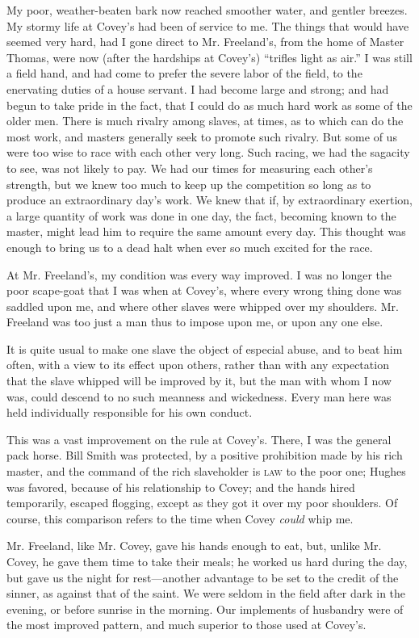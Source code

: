 My poor, weather-beaten bark now reached smoother water, and gentler
breezes. My stormy life at Covey's had been of service to me. The things
that would have seemed very hard, had I gone direct to Mr. Freeland's,
from the home of Master Thomas, were now (after the hardships at
Covey's) ``trifles light as air.'' I was still a field hand, and had
come to prefer the severe labor of the field, to the enervating duties
of a house servant. I had become large and strong; and had begun to take
pride in the fact, that I could do as much hard work as some of the
older men. There is much rivalry among slaves, at times, as to which can
do the most work, and masters generally seek to promote such rivalry.
But some of us were too wise to race with each other very long. Such
racing, we had the sagacity to see, was not likely to pay. We had our
times for measuring {}each other's strength, but we knew too much to
keep up the competition so long as to produce an extraordinary day's
work. We knew that if, by extraordinary exertion, a large quantity of
work was done in one day, the fact, becoming known to the master, might
lead him to require the same amount every day. This thought was enough
to bring us to a dead halt when ever so much excited for the race.

At Mr. Freeland's, my condition was every way improved. I was no longer
the poor scape-goat that I was when at Covey's, where every wrong thing
done was saddled upon me, and where other slaves were whipped over my
shoulders. Mr. Freeland was too just a man thus to impose upon me, or
upon any one else.

It is quite usual to make one slave the object of especial abuse, and to
beat him often, with a view to its effect upon others, rather than with
any expectation that the slave whipped will be improved by it, but the
man with whom I now was, could descend to no such meanness and
wickedness. Every man here was held individually responsible for his own
conduct.

This was a vast improvement on the rule at Covey's. There, I was the
general pack horse. Bill Smith was protected, by a positive prohibition
made by his rich master, and the command of the rich slaveholder is
\textsc{law} to the poor one; Hughes was favored, because of his
relationship to Covey; and the hands hired temporarily, escaped
flogging, except as they got it over my poor shoulders. Of course, this
comparison refers to the time when Covey \emph{could} whip me.

Mr. Freeland, like Mr. Covey, gave his hands enough to eat, but, unlike
Mr. Covey, he gave them {}time to take their meals; he worked us hard
during the day, but gave us the night for rest---another advantage to be
set to the credit of the sinner, as against that of the saint. We were
seldom in the field after dark in the evening, or before sunrise in the
morning. Our implements of husbandry were of the most improved pattern,
and much superior to those used at Covey's.

